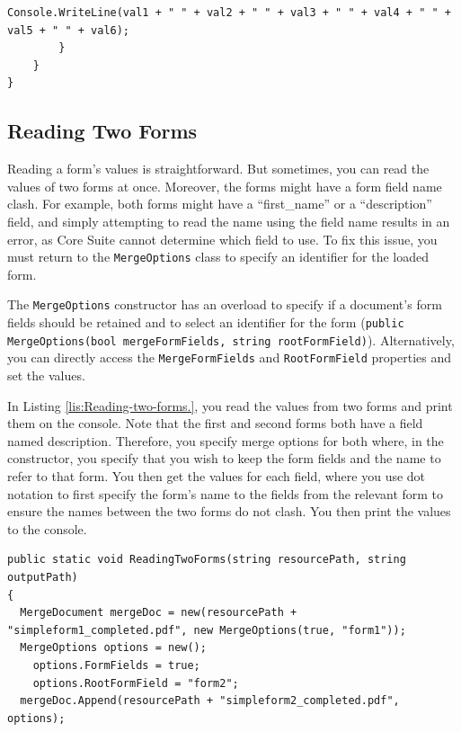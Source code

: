 \documentclass[american]{tufte-book}
\numberwithin{equation}{section}
\numberwithin{figure}{section}
\begin{document}
{{\begin{lstlisting}[caption={Reading form field values.},label={lis:Reading-form-field},basicstyle={\footnotesize\ttfamily},breaklines=true]
            Console.WriteLine(val1 + " " + val2 + " " + val3 + " " + val4 + " " + val5 + " " + val6);
        }
    }
}
\end{lstlisting}
\leavevmode\egroup


\subsection{Reading Two Forms}\label{subsec:Reading-Two-Forms}

Reading a form's values is straightforward. But sometimes, you can
read the values of two forms at once. Moreover, the forms might have
a form field name clash. For example, both forms might have a “first\_name”
or a “description” field, and simply attempting to read the name using
the field name results in an error, as Core Suite cannot determine
which field to use. To fix this issue, you must return to the \texttt{MergeOptions}
class to specify an identifier for the loaded form. 

The \texttt{MergeOptions} constructor has an overload to specify if
a document's form fields should be retained and to select an identifier
for the form (\texttt{public MergeOptions(bool mergeFormFields, string
rootFormField)}). Alternatively, you can directly access the \texttt{MergeFormFields}
and \texttt{RootFormField} properties and set the values.

In Listing \ref{lis:Reading-two-forms.}, you read the values from
two forms and print them on the console. Note that the first and second
forms both have a field named description. Therefore, you specify
merge options for both where, in the constructor, you specify that
you wish to keep the form fields and the name to refer to that form.
You then get the values for each field, where you use dot notation
to first specify the form's name to the fields from the relevant form
to ensure the names between the two forms do not clash. You then print
the values to the console.
\bgroup{}
\begin{lstlisting}[caption={Reading two forms.},label={lis:Reading-two-forms.},basicstyle={\footnotesize\ttfamily},breaklines=true]
public static void ReadingTwoForms(string resourcePath, string outputPath)
{
  MergeDocument mergeDoc = new(resourcePath + "simpleform1_completed.pdf", new MergeOptions(true, "form1"));
  MergeOptions options = new();
    options.FormFields = true;
    options.RootFormField = "form2";
  mergeDoc.Append(resourcePath + "simpleform2_completed.pdf", options);


\end{lstlisting}}}
\end{document}
